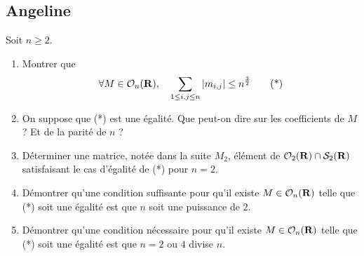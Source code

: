 \subsection{Angeline}
\begin{exercice}
	Soit $n\geq 2$.
	\begin{enumerate}
		\item Montrer que \[\forall M\in\mathcal O_n(\operatorname{\mathbf{R}}),\quad \sum_{1\leq i,j\leq n}|m_{i,j}|\leq n^{\frac32}\tag{*}\]
		\item On suppose que (*) est une égalité. Que peut-on dire sur les coefficients de $M$ ? Et de la parité de $n$ ?
		\item Déterminer une matrice, notée dans la suite $M_2$, élément de $\mathcal O_2(\operatorname{\mathbf{R}})\cap\mathcal S_2(\operatorname{\mathbf{R}})$ satisfaisant le cas d'égalité de (*) pour $n = 2$.
		\item Démontrer qu'une condition suffisante pour qu'il existe $M\in\mathcal O_n(\operatorname{\mathbf{R}})$ telle que (*) soit une égalité est que $n$ soit une puissance de $2$.
		\item Démontrer qu'une condition nécessaire pour qu'il existe $M\in\mathcal O_n(\operatorname{\mathbf{R}})$ telle que (*) soit une égalité est que $n=2$ ou $4$ divise $n$.
	\end{enumerate}
\end{exercice}

